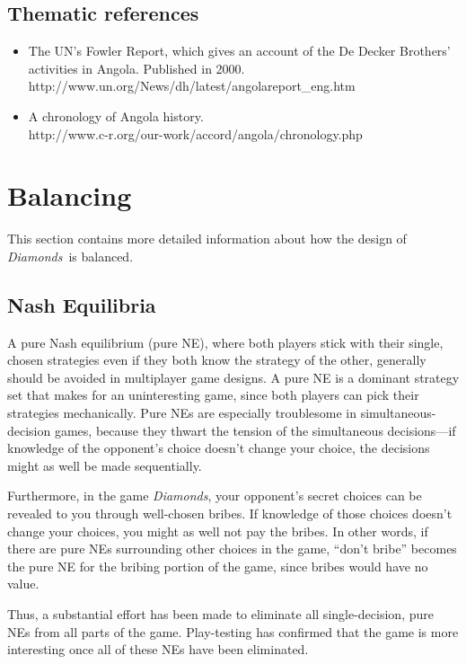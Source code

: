 \documentclass[12pt]{article}
\newcommand{\gtitle}{{\it Diamonds}}
\begin{document}
\subsection{Thematic references}
\begin{itemize}
\item The UN's Fowler Report, which gives an account of the De Decker Brothers' activities in Angola.  Published in 2000.\\
http://www.un.org/News/dh/latest/angolareport\_eng.htm

\item A chronology of Angola history.\\
http://www.c-r.org/our-work/accord/angola/chronology.php
\end{itemize}


\newpage

\section{Balancing}
This section contains more detailed information about how the design of \gtitle\ is balanced.

\subsection{Nash Equilibria}
A pure Nash equilibrium (pure NE), where both players stick with their single, chosen strategies even if they both know the strategy of the other, generally should be avoided in multiplayer game designs.  A pure NE is a dominant strategy set that makes for an uninteresting game, since both players can pick their strategies mechanically.  Pure NEs are especially troublesome in simultaneous-decision games, because they thwart the tension of the simultaneous decisions---if knowledge of the opponent's choice doesn't change your choice, the decisions might as well be made sequentially.

Furthermore, in the game \gtitle, your opponent's secret choices can be revealed to you through well-chosen bribes.  If knowledge of those choices doesn't change your choices, you might as well not pay the bribes.  In other words, if there are pure NEs surrounding other choices in the game, ``don't bribe'' becomes the pure NE for the bribing portion of the game, since bribes would have no value.

Thus, a substantial effort has been made to eliminate all single-decision, pure NEs from all parts of the game.  Play-testing has confirmed that the game is more interesting once all of these NEs have been eliminated.
\end{document}
